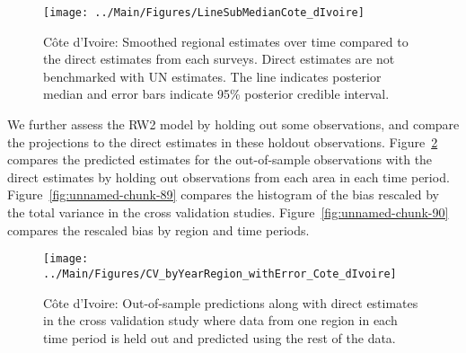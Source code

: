 \documentclass[12pt]{article}\usepackage[]{graphicx}\usepackage[]{color}
\newenvironment{knitrout}{}{} %
\begin{document}
\begin{knitrout}
\color{fgcolor}\begin{figure}[bht]

{\centering \texttt{[image: ../Main/Figures/LineSubMedianCote\_dIvoire]} 

}

\caption[C\^{o}te d'Ivoire]{C\^{o}te d'Ivoire: Smoothed regional estimates over time compared to the direct estimates from each surveys. Direct estimates are not benchmarked with UN estimates. The line indicates posterior median and error bars indicate 95\% posterior credible interval.}\label{fig:unnamed-chunk-87}
\end{figure}


\end{knitrout}
We further assess the RW2 model by holding out some observations, and compare the projections to the direct estimates in these holdout observations. Figure~\ref{fig:unnamed-chunk-88} compares the predicted estimates for the out-of-sample observations  with the direct estimates by holding out observations from each area in each time period.  Figure~\ref{fig:unnamed-chunk-89} compares the histogram of the bias rescaled by the total variance in the cross validation studies. Figure~\ref{fig:unnamed-chunk-90} compares the rescaled bias by region and time periods.



 
\begin{knitrout}
\color{fgcolor}\begin{figure}[bht]

{\centering \texttt{[image: ../Main/Figures/CV\_byYearRegion\_withError\_Cote\_dIvoire]} 

}

\caption[C\^{o}te d'Ivoire]{C\^{o}te d'Ivoire: Out-of-sample predictions along with direct estimates in the cross validation study where data from one region in each time period is held out and predicted using the rest of the data.}\label{fig:unnamed-chunk-88}
\end{figure}


\end{knitrout}
\end{document}
